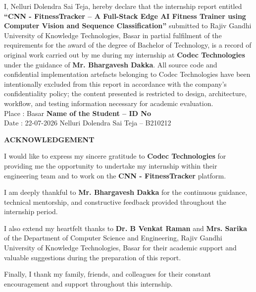 \documentclass[12pt,a4paper]{report}
\begin{document}
I, Nelluri Dolendra Sai Teja, hereby declare that the internship report entitled \textbf{``CNN - FitnessTracker -- A Full-Stack Edge AI Fitness Trainer using Computer Vision and Sequence Classification''} submitted to Rajiv Gandhi University of Knowledge Technologies, Basar in partial fulfilment of the requirements for the award of the degree of Bachelor of Technology, is a record of original work carried out by me during my internship at \textbf{Codec Technologies} under the guidance of \textbf{Mr. Bhargavesh Dakka}. All source code and confidential implementation artefacts belonging to Codec Technologies have been intentionally excluded from this report in accordance with the company's confidentiality policy; the content presented is restricted to design, architecture, workflow, and testing information necessary for academic evaluation. \\[2.5cm]

\noindent Place : Basar \hfill \textbf{Name of the Student -- ID No} \\[0.15cm]
Date : 22-07-2026 \hfill Nelluri Dolendra Sai Teja -- B210212

\newpage
\begin{center}
{\Large\bfseries ACKNOWLEDGEMENT} \\[1.0cm]
\end{center}

I would like to express my sincere gratitude to \textbf{Codec Technologies} for providing me the opportunity to undertake my internship within their engineering team and to work on the \textbf{CNN - FitnessTracker} platform.

I am deeply thankful to \textbf{Mr. Bhargavesh Dakka} for the continuous guidance, technical mentorship, and constructive feedback provided throughout the internship period.

I also extend my heartfelt thanks to \textbf{Dr. B Venkat Raman} and \textbf{Mrs. Sarika} of the Department of Computer Science and Engineering, Rajiv Gandhi University of Knowledge Technologies, Basar for their academic support and valuable suggestions during the preparation of this report.

Finally, I thank my family, friends, and colleagues for their constant encouragement and support throughout this internship. \\[2.0cm]
\end{document}

